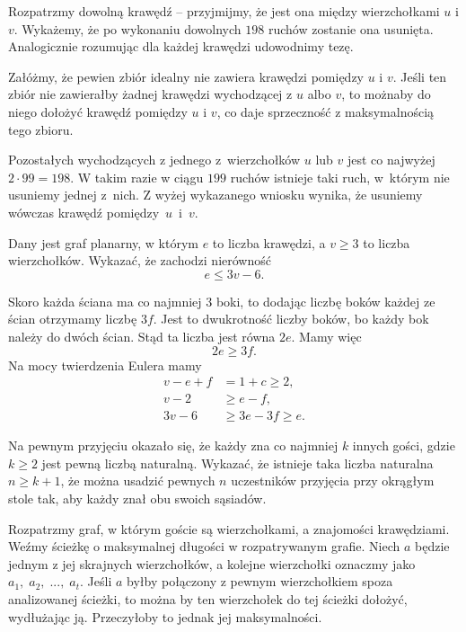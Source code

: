 \noindent
Rozpatrzmy dowolną krawędź -- przyjmijmy, że jest ona między wierzchołkami $u$ i $v$. Wykażemy, że po wykonaniu dowolnych $198$ ruchów zostanie ona usunięta. Analogicznie rozumując dla każdej krawędzi udowodnimy tezę.

\vspace{5px}
\noindent
Załóżmy, że pewien zbiór idealny nie zawiera krawędzi pomiędzy $u$ i $v$. Jeśli ten zbiór nie zawierałby żadnej krawędzi wychodzącej z $u$ albo $v$, to możnaby do niego dołożyć krawędź pomiędzy $u$ i $v$, co daje sprzeczność z maksymalnością tego zbioru. 

\vspace{5px}
\noindent
Pozostałych wychodzących z jednego z~wierzchołków $u$ lub $v$ jest co najwyżej $2 \cdot 99 = 198$. W takim razie w ciągu $199$ ruchów istnieje taki ruch, w~którym nie usuniemy jednej z~nich. Z wyżej wykazanego wniosku wynika, że usuniemy wówczas krawędź pomiędzy~$u$~i~$v$.

\begin{problem}{4}
	Dany jest graf planarny, w którym $e$ to liczba krawędzi, a $v \geqslant 3$ to liczba wierzchołków. Wykazać, że zachodzi nierówność
	\[
		e \leqslant 3v - 6.
	\]
\end{problem}

\noindent
Skoro każda ściana ma co najmniej $3$ boki, to dodając liczbę boków każdej ze ścian otrzymamy liczbę $3f$. Jest to dwukrotność liczby boków, bo każdy bok należy do dwóch ścian. Stąd ta liczba jest równa $2e$. Mamy więc
\[
	2e \geqslant 3f.
\]
Na mocy twierdzenia Eulera mamy
\begin{align*}
	v - e + f &= 1 + c \geqslant 2, \\
	v - 2 &\geqslant e - f, \\
	3v  - 6 &\geqslant 3e - 3f \geqslant e.
\end{align*}

\begin{problem}{5}
	Na pewnym przyjęciu okazało się, że każdy zna co najmniej $k$ innych gości, gdzie $k \geqslant 2$ jest pewną liczbą naturalną. Wykazać, że istnieje taka liczba naturalna $n\geqslant k + 1$, że można usadzić pewnych $n$ uczestników przyjęcia przy okrągłym stole tak, aby każdy znał obu swoich sąsiadów.
\end{problem}

\noindent
Rozpatrzmy graf, w którym goście są wierzchołkami, a znajomości krawędziami.
Weźmy ścieżkę o maksymalnej długości w rozpatrywanym grafie. Niech $a$ będzie jednym z jej skrajnych wierzchołków, a kolejne wierzchołki oznaczmy jako $a_1,\; a_2,\; ...,\; a_t$. Jeśli $a$ byłby połączony z pewnym wierzchołkiem spoza analizowanej ścieżki, to można by ten wierzchołek do tej ścieżki dołożyć, wydłużając ją. Przeczyłoby to jednak jej maksymalności.

